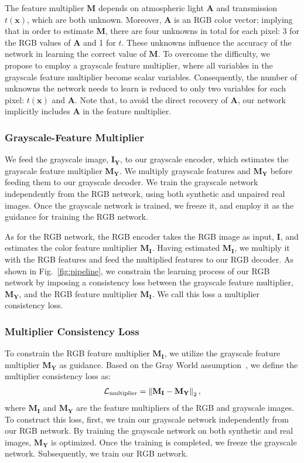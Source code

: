 \documentclass[runningheads]{llncs}
\begin{document}
The feature multiplier $\mathbf{M}$ depends on atmospheric light $\mathbf{A}$ and transmission $t(\mathbf{x})$, which are both unknown. 
Moreover, $\mathbf{A}$ is an RGB color vector; implying that in order to estimate $\mathbf{M}$, there are four unknowns in total for each pixel: 3 for the RGB values of $\mathbf{A}$ and 1 for $t$. 
These unknowns influence the accuracy of the network in learning the correct value of $\mathbf{M}$. 
To overcome the difficulty, we propose to employ a grayscale feature multiplier, where all variables in the grayscale feature multiplier become scalar variables. 
Consequently, the number of unknowns the network needs to learn is reduced to only two variables for each pixel: $t(\mathbf{x})$ and $\mathbf{A}$.
Note that, to avoid the direct recovery of $\mathbf{A}$, our network implicitly includes $\mathbf{A}$ in the feature multiplier.
 
\subsubsection{Grayscale-Feature Multiplier}
We feed the grayscale image, $\mathbf{I_Y}$, to our grayscale encoder, which estimates the grayscale feature multiplier $\mathbf{M_Y}$. 
We multiply grayscale features and $\mathbf{M_Y}$ before feeding them to our grayscale decoder.
We train the grayscale network independently from the RGB network, using both synthetic and unpaired real images.
Once the grayscale network is trained, we freeze it, and employ it as the guidance for training the RGB network.

As for the RGB network, the RGB encoder takes the RGB image as input, $\mathbf{I}$, and estimates the color feature multiplier $\mathbf{M_I}$. 
Having estimated $\mathbf{M_I}$, we multiply it with the RGB features and feed the multiplied features to our RGB decoder.
As shown in Fig.~\ref{fig:pipeline}, we constrain the learning process of our RGB network by imposing a consistency loss between the grayscale feature multiplier, $\mathbf{M_Y}$, and the RGB feature multiplier $\mathbf{M_I}$.
We call this loss a multiplier consistency loss.

\subsubsection{Multiplier Consistency Loss} 
To constrain the RGB feature multiplier $\mathbf{M_I}$, we utilize the grayscale feature multiplier $\mathbf{M_Y}$ as guidance.
Based on the Gray World assumption~\cite{buchsbaum1980spatial},  we define the multiplier consistency loss as:
\begin{align}
\mathcal{L}_{\rm multiplier} = \left \| \mathbf{M_I}-\mathbf{{M_Y}} \right \| _{2},
\label{eq:loss_multi_real}
\end{align} 
where $\mathbf{M_I}$ and $\mathbf{M_Y}$ are the feature multipliers of the RGB and grayscale images.
To construct this loss, first, we train our grayscale network independently from our RGB network.
By training the grayscale network on both synthetic and real images, $\mathbf{M_Y}$ is optimized. 
Once the training is completed, we freeze the grayscale network.
Subsequently, we train our RGB network. 
\end{document}

